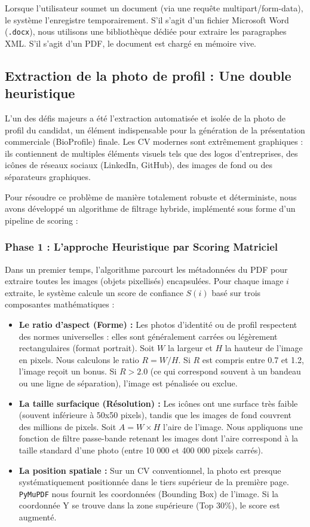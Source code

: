 Lorsque l'utilisateur soumet un document (via une requête multipart/form-data), le système l'enregistre temporairement. S'il s'agit d'un fichier Microsoft Word (\texttt{.docx}), nous utilisons une bibliothèque dédiée pour extraire les paragraphes XML. S'il s'agit d'un PDF, le document est chargé en mémoire vive.

\subsection{Extraction de la photo de profil : Une double heuristique}
L'un des défis majeurs a été l'extraction automatisée et isolée de la photo de profil du candidat, un élément indispensable pour la génération de la présentation commerciale (BioProfile) finale. Les CV modernes sont extrêmement graphiques : ils contiennent de multiples éléments visuels tels que des logos d'entreprises, des icônes de réseaux sociaux (LinkedIn, GitHub), des images de fond ou des séparateurs graphiques.

Pour résoudre ce problème de manière totalement robuste et déterministe, nous avons développé un algorithme de filtrage hybride, implémenté sous forme d'un pipeline de scoring :

\subsubsection{Phase 1 : L'approche Heuristique par Scoring Matriciel}
Dans un premier temps, l'algorithme parcourt les métadonnées du PDF pour extraire toutes les images (objets pixellisés) encapsulées. Pour chaque image $i$ extraite, le système calcule un score de confiance $S(i)$ basé sur trois composantes mathématiques :

\begin{itemize}
    \item \textbf{Le ratio d'aspect (Forme) :} Les photos d'identité ou de profil respectent des normes universelles : elles sont généralement carrées ou légèrement rectangulaires (format portrait). Soit $W$ la largeur et $H$ la hauteur de l'image en pixels. Nous calculons le ratio $R = W / H$. Si $R$ est compris entre 0.7 et 1.2, l'image reçoit un bonus. Si $R > 2.0$ (ce qui correspond souvent à un bandeau ou une ligne de séparation), l'image est pénalisée ou exclue.
    \item \textbf{La taille surfacique (Résolution) :} Les icônes ont une surface très faible (souvent inférieure à 50x50 pixels), tandis que les images de fond couvrent des millions de pixels. Soit $A = W \times H$ l'aire de l'image. Nous appliquons une fonction de filtre passe-bande retenant les images dont l'aire correspond à la taille standard d'une photo (entre 10 000 et 400 000 pixels carrés).
    \item \textbf{La position spatiale :} Sur un CV conventionnel, la photo est presque systématiquement positionnée dans le tiers supérieur de la première page. \texttt{PyMuPDF} nous fournit les coordonnées (Bounding Box) de l'image. Si la coordonnée Y se trouve dans la zone supérieure (Top 30\%), le score est augmenté.
\end{itemize}

